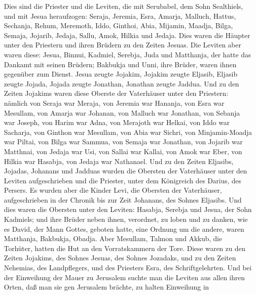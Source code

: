  Dies sind die Priester und die Leviten, die mit Serubabel,
dem Sohn Sealthiels, und mit Jesua heraufzogen: Seraja, Jeremia, Esra,
 Amarja, Malluch, Hattus,  Sechanja, Rehum,
Meremoth,  Iddo, Ginthoi, Abia,  Mijamin,
Maadja, Bilga,  Semaja, Jojarib, Jedaja,  Sallu,
Amok, Hilkia und Jedaja. Dies waren die Häupter unter den Priestern und
ihren Brüdern zu den Zeiten Jesuas.  Die Leviten aber waren
diese: Jesua, Binnui, Kadmiel, Serebja, Juda und Matthanja, der hatte
das Dankamt mit seinen Brüdern;  Bakbukja und Unni, ihre
Brüder, waren ihnen gegenüber zum Dienst.  Jesua zeugte
Jojakim, Jojakim zeugte Eljasib, Eljasib zeugte Jojada, 
Jojada zeugte Jonathan, Jonathan zeugte Jaddua.  Und zu den
Zeiten Jojakims waren diese Oberste der Vaterhäuser unter den Priestern:
nämlich von Seraja war Meraja, von Jeremia war Hananja, 
von Esra war Mesullam, von Amarja war Johanan,  von Malluch
war Jonathan, von Sebanja war Joseph,  von Harim war Adna,
von Merajoth war Helkai,  von Iddo war Sacharja, von
Ginthon war Mesullam,  von Abia war Sichri, von
Minjamin-Moadja war Piltai,  von Bilga war Sammua, von
Semaja war Jonathan,  von Jojarib war Matthnai, von Jedaja
war Usi,  von Sallai war Kallai, von Amok war Eber,
 von Hilkia war Hasabja, von Jedaja war Nathanael.
 Und zu den Zeiten Eljasibs, Jojadas, Johanans und Jadduas
wurden die Obersten der Vaterhäuser unter den Leviten aufgeschrieben und
die Priester, unter dem Königreich des Darius, des Persers.
 Es wurden aber die Kinder Levi, die Obersten der
Vaterhäuser, aufgeschrieben in der Chronik bis zur Zeit Johanans, des
Sohnes Eljasibs.  Und dies waren die Obersten unter den
Leviten: Hasabja, Serebja und Jesua, der Sohn Kadmiels; und ihre Brüder
neben ihnen, verordnet, zu loben und zu danken, wie es David, der Mann
Gottes, geboten hatte, eine Ordnung um die andere,  waren
Matthanja, Bakbukja, Obadja. Aber Mesullam, Talmon und Akkub, die
Torhüter, hatten die Hut an den Vorratskammern der Tore. 
Diese waren zu den Zeiten Jojakims, des Sohnes Jesuas, des Sohnes
Jozadaks, und zu den Zeiten Nehemias, des Landpflegers, und des
Priesters Esra, des Schriftgelehrten.  Und bei der
Einweihung der Mauer zu Jerusalem suchte man die Leviten aus allen ihren
Orten, daß man sie gen Jerusalem brächte, zu halten Einweihung in
